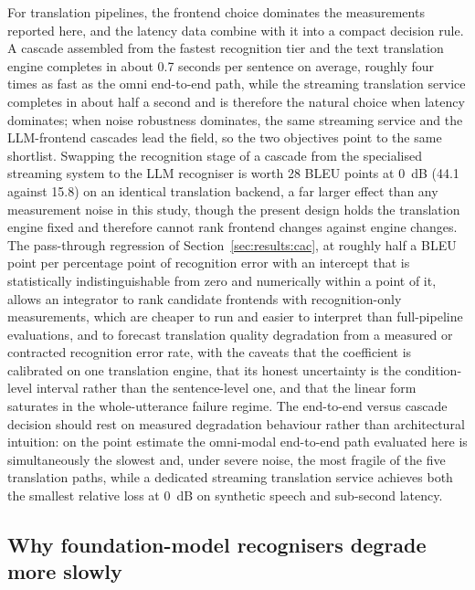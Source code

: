 For translation pipelines, the frontend choice dominates the measurements
reported here, and the latency data combine with it into a compact decision
rule. A cascade assembled from the fastest recognition tier and the text
translation engine completes in about 0.7 seconds per sentence on average,
roughly four times as fast as the omni end-to-end path, while the streaming
translation service completes in about half a second and is therefore the
natural choice when latency dominates; when noise robustness dominates, the
same streaming service and the LLM-frontend cascades lead the field, so the
two objectives point to the same shortlist. Swapping the recognition stage
of a cascade from the specialised streaming system to the LLM recogniser is
worth 28 BLEU points at 0~dB (44.1 against 15.8) on an identical translation backend, a far
larger effect than any measurement noise in this study, though the present
design holds the translation engine fixed and therefore cannot rank frontend
changes against engine changes. The pass-through regression of
Section~\ref{sec:results:cac}, at roughly half a BLEU point per percentage
point of recognition error with an intercept that is statistically
indistinguishable from zero and numerically within a point of it, allows an
integrator to rank candidate frontends with recognition-only measurements,
which are cheaper to run and easier to interpret than full-pipeline
evaluations, and to forecast translation quality degradation from a
measured or contracted recognition error rate, with the caveats that the
coefficient is calibrated on one translation engine, that its honest
uncertainty is the condition-level interval rather than the sentence-level
one, and that the linear form saturates in the whole-utterance failure
regime. The end-to-end versus
cascade decision should rest on measured degradation behaviour rather than
architectural intuition: on the point estimate the omni-modal end-to-end
path evaluated here is
simultaneously the slowest and, under severe noise, the most fragile of the
five translation paths, while a dedicated streaming translation service
achieves both the smallest relative loss at 0~dB on synthetic speech and
sub-second latency.

\subsection{Why foundation-model recognisers degrade more slowly}

